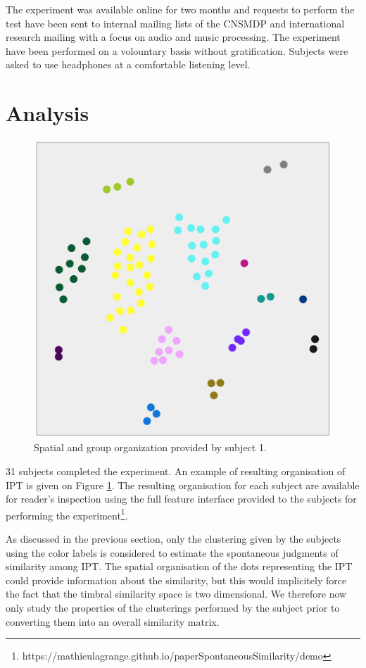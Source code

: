 \documentclass{article}
\newcommand{\ipt}{IPT\xspace}
\begin{document}
The experiment was available online for two months and requests to perform the test have been sent to internal mailing lists of the CNSMDP and international research mailing with a focus on audio and music processing. The experiment have been performed on a volountary basis without gratification. Subjects were asked to use headphones at a comfortable listening level.

\section{Analysis}\label{sec:analysis}

\begin{figure}
\center
\includegraphics[width = \textwidth]{figures/xp2example.png}
\caption{Spatial and group organization provided by subject 1.}
\label{fig:xp2display}
\end{figure}

31 subjects completed the experiment. An example of resulting organisation of \ipt is given on Figure \ref{fig:xp2display}. The resulting organisation for each subject are available for reader's inspection using the full feature interface provided to the subjects for performing the experiment\footnote{https://mathieulagrange.github.io/paperSpontaneousSimilarity/demo}.

As discussed in the previous section, only the clustering given by the subjects using the color labels is considered to estimate the spontaneous judgments of similarity among \ipt. The spatial organisation of the dots representing the \ipt could provide information about the similarity, but this would implicitely force the fact that the timbral similarity space is two dimensional. We therefore now only study the properties of the clusterings performed by the subject prior to converting them into an overall similarity matrix.
\end{document}
